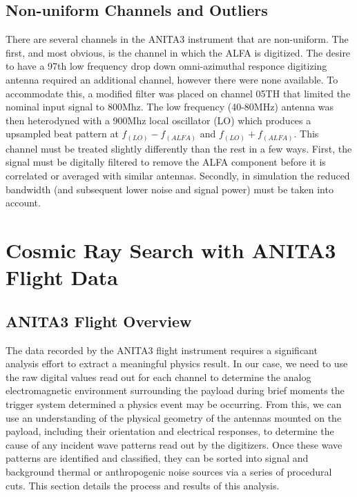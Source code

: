 \section{Non-uniform Channels and Outliers}
	There are several channels in the ANITA3 instrument that are non-uniform.  The first, and most obvious, is the channel in which the ALFA is digitized.  The desire to have a 97th low frequency drop down omni-azimuthal responce digitizing antenna required an additional channel, however there were none available.  To accommodate this, a modified filter was placed on channel 05TH that limited the nominal input signal to 800Mhz.  The low frequency (40-80MHz) antenna was then heterodyned with a 900Mhz local oscillator (LO) which produces a upsampled beat pattern at $f_(LO)-f_(ALFA)$ and $f_(LO)+f_(ALFA)$. This channel must be treated slightly differently than the rest in a few ways.  First, the signal must be digitally filtered to remove the ALFA component before it is correlated or averaged with similar antennas.  Secondly, in simulation the reduced bandwidth (and subsequent lower noise and signal power) must be taken into account.





\chapter{Cosmic Ray Search with ANITA3 Flight Data}
\section{ANITA3 Flight Overview}
	The data recorded by the ANITA3 flight instrument requires a significant analysis effort to extract a meaningful physics result.  In our case, we need to use the raw digital values read out for each channel to determine the analog electromagnetic environment surrounding the payload during brief moments the trigger system determined a physics event may be occurring.  From this, we can use an understanding of the physical geometry of the antennas mounted on the payload, including their orientation and electrical responses, to determine the cause of any incident wave patterns read out by the digitizers.  Once these wave patterns are identified and classified, they can be sorted into signal and background thermal or anthropogenic noise sources via a series of procedural cuts.  This section details the process and results of this analysis.
	
